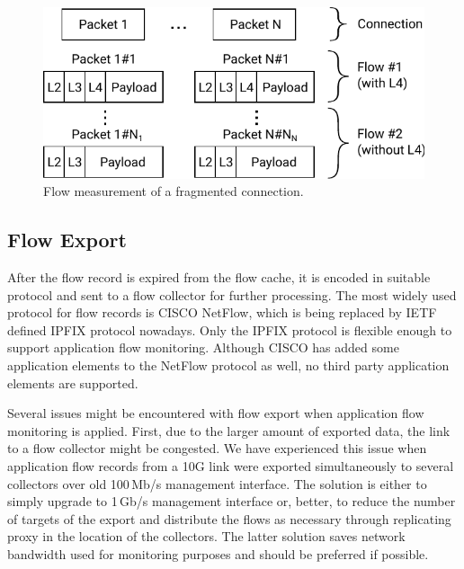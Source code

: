 \begin{figure}[t!]
  \begin{center}
    \includegraphics[width=\textwidth]{figures/fragmented-flow}
  \end{center}
  \caption{Flow measurement of a fragmented connection.}
  \label{fig:fragmented-flow}
\end{figure}

\subsection{Flow Export}


After the flow record is expired from the flow cache, it is encoded in suitable protocol and sent to a flow collector for further processing. The most widely used protocol for flow records is CISCO NetFlow, which is being replaced by IETF defined IPFIX protocol nowadays. Only the IPFIX protocol is flexible enough to support application flow monitoring. Although CISCO has added some application elements to the NetFlow protocol as well, no third party application elements are supported.

Several issues might be encountered with flow export when application flow monitoring is applied. First, due to the larger amount of exported data, the link to a flow collector might be congested. We have experienced this issue when application flow records from a 10G link were exported simultaneously to several collectors over old 100\,Mb/s management interface. The solution is either to simply upgrade to 1\,Gb/s management interface or, better, to reduce the number of targets of the export and distribute the flows as necessary through replicating proxy in the location of the collectors. The latter solution saves network bandwidth used for monitoring purposes and should be preferred if possible.

